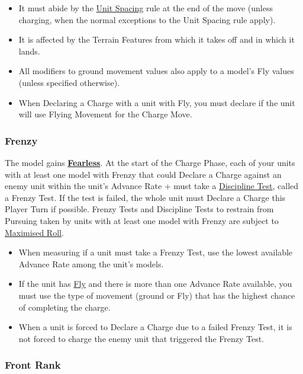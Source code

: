 \begin{itemize}[label={-}]
\item It must abide by the \hyperref[unit_spacing]{Unit Spacing} rule at the end of the move (unless charging, when the normal exceptions to the Unit Spacing rule apply).
\item It is affected by the Terrain Features from which it takes off and in which it lands.
\item All modifiers to ground movement values also apply to a model's Fly values (unless specified otherwise).
\item When Declaring a Charge with a unit with Fly, you must declare if the unit will use Flying Movement for the Charge Move.
\end{itemize}

\subsubsection{Frenzy}
\label{frenzy}

The model gains \hyperref[fearless]{\textbf{Fearless}}. At the start of the Charge Phase, each of your units with at least one model with Frenzy that could Declare a Charge against an enemy unit within the unit's Advance Rate + must take a \hyperref[performing_a_discipline_test]{Discipline Test}, called a Frenzy Test. If the test is failed, the whole unit must Declare a Charge this Player Turn if possible. Frenzy Tests and Discipline Tests to restrain from Pursuing taken by units with at least one model with Frenzy are subject to \hyperref[maximised_roll]{Maximised Roll}.

\begin{itemize}[label={-}]
\item When measuring if a unit must take a Frenzy Test, use the lowest available Advance Rate among the unit's models.
\item If the unit has \hyperref[fly]{Fly} and there is more than one Advance Rate available, you must use the type of movement (ground or Fly) that has the highest chance of completing the charge.
\item When a unit is forced to Declare a Charge due to a failed Frenzy Test, it is not forced to charge the enemy unit that triggered the Frenzy Test.
\end{itemize}



\subsubsection{Front Rank}
\label{front_rank}

